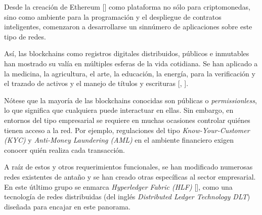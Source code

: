 

Desde la creaci\'on de Ethereum [\cite{ethereum2014ethereum}] como plataforma no s\'olo para criptomonedas, sino como ambiente para la programaci\'on y el despliegue de contratos inteligentes, comenzaron a desarrollarse un sinn\'umero de aplicaciones sobre este tipo de redes.

As\'i, las blockchains como registros digitales distribuidos, p\'ublicos e inmutables han mostrado su val\'ia en m\'ultiples esferas de la vida cotidiana. Se han aplicado a la medicina, la agricultura, el arte, la educaci\'on, la energ\'ia, para la verificaci\'on y el trazado de activos y el manejo de t\'itulos y escrituras [\cite{abou2019blockchain}, \cite{engelhardt2017hitching}].



N\'otese que la mayor\'ia de las blockchains conocidas son p\'ublicas o \emph{permissionless}, lo que significa que cualquiera puede interactuar en ellas. Sin embargo, en entornos del tipo empresarial se requiere en muchas ocasiones controlar qui\'enes tienen acceso a la red. Por ejemplo, regulaciones del tipo \emph{Know-Your-Customer (KYC)} y \emph{Anti-Money Laundering (AML)} en el ambiente financiero exigen conocer qui\'en realiza cada transacci\'on. 

A ra\'iz de estos y otros requerimientos funcionales, se han modificado numerosas redes existentes de anta\~no y se han creado otras espec\'ificas al sector empresarial. En este \'utltimo grupo se enmarca \emph{Hyperledger Fabric (HLF)} [\cite{androulaki2018hyperledger}], como una tecnolog\'ia de redes distribuidas (del ingl\'es \emph{Distributed Ledger Technology DLT}) dise\~nada para encajar en este panorama.%

